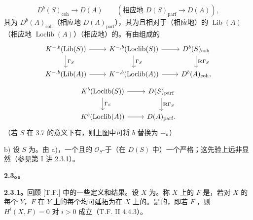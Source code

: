 \[
D^b(S)_{\mathrm{coh}}\longrightarrow D(A)\qquad
(\text{相应地 }D(S)_{\mathrm{parf}}\longrightarrow D(A)),
\]
其为
 $D^b(A)_{\mathrm{coh}}$（相应地 $D(A)_{\mathrm{parf}}$），其为且相对于（相应地）的 $\operatorname{Lib}(A)$（相应地 $\operatorname{Loclib}(A)$）（相应地）的。有由组成的
\[
\begin{tikzcd}
K^{-,b}(\operatorname{Lib}(S))\ar[r]\ar[d,"\Gamma_S"]&K^{-,b}(\operatorname{Loclib}(S))\ar[r]\ar[d,"\Gamma_S"]&D^b(S)_{\mathrm{coh}}\ar[d,"\mathbf R\Gamma_S"]\\
K^{-,b}(\operatorname{Lib}(A))\ar[r]&K^{-,b}(\operatorname{Loclib}(A))\ar[r]&D^b(A)_{\mathrm{coh}},
\end{tikzcd}
\]
\[
\begin{tikzcd}
K^b(\operatorname{Loclib}(S))\ar[r]\ar[d,"\Gamma_S"]&D(S)_{\mathrm{parf}}\ar[d,"\mathbf R\Gamma_S"]\\
K^b(\operatorname{Loclib}(A))\ar[r]&D(A)_{\mathrm{parf}}.
\end{tikzcd}
\]
（若 $S$ 在 3.7 的意义下有，则上图中可将 $b$ 替换为 $-$。）

b) 设 $S$ 为。由 a)，一个且的 $\mathcal O_S$-于（在 $D(S)$ 中）一个严格；这先验上远非显然（参见第 I 讲 2.3.1）。

\textbf{2.3。。}

\textbf{2.3.1。}回顾 [T.F.] 中的一些定义和结果。设 $X$ 为。称 $X$ 上的 $F$ 是，若对 $X$ 的每个 $Y$，$F$ 在 $Y$ 上的每个均可延拓为在 $X$ 上的。是的，即若 $F$ ，则 $H^i(X,F)=0$ 对 $i>0$ 成立（T.F. II 4.4.3）。

